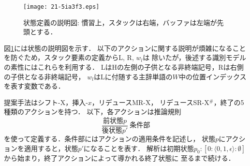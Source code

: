 \documentclass[japanese]{jnlp_1.4}
\begin{document}
\begin{figure}[b]
\begin{center}
\texttt{[image: 21-5ia3f3.eps]}
\end{center}
\caption{状態定義の説明図: 慣習上，スタックは右端，バッファは左端が先頭とする．}
\label{fig:state}
\end{figure}

図\ref{fig:state}には状態の説明図を示す．
以下のアクションに関する説明が煩雑になることを防ぐため，スタック要素の定義からL, R, $w_{l}$は
除いたが，後述する識別モデルの素性にはこれらを利用する．
LはHの左側の子供となる非終端記号，Rは右側の子供となる非終端記号，
$w_{l}$はLに付随する主辞単語の$W$中の位置インデックスを表す変数である．

提案手法はシフト-X，挿入-$x$，リデュースMR-X，
リデュースSR-X$^{\#}$，終了の5種類のアクションを持つ．
以下，各アクションは推論規則
\[
\frac{\text{前状態}p}{\text{後状態}p'}\ \text{条件部}
\]
を使って定義する．条件部にはアクションの適用条件を記述し，
状態$p$にアクションを適用すると，状態$p'$になることを表す．
解析は初期状態$p_{0}: [0: \langle 0, 1, \epsilon\rangle: \emptyset]$
から始まり，終了アクションによって導かれる終了状態に
至るまで続ける．
\end{document}
